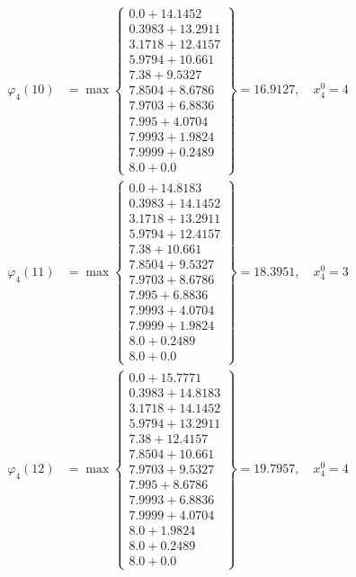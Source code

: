 \documentclass{article}
\begin{document}
\begin{align*}
  
  
  
\varphi_{4}(10) &= \max \left\{ \begin{array}{c}
0.0 + 14.1452 \\
 0.3983 + 13.2911 \\
 3.1718 + 12.4157 \\
 5.9794 + 10.661 \\
 7.38 + 9.5327 \\
 7.8504 + 8.6786 \\
 7.9703 + 6.8836 \\
 7.995 + 4.0704 \\
 7.9993 + 1.9824 \\
 7.9999 + 0.2489 \\
 8.0 + 0.0
\end{array} \right\}=16.9127,\quad x_{4}^0=4\\
  
  
  
  
\varphi_{4}(11) &= \max \left\{ \begin{array}{c}
0.0 + 14.8183 \\
 0.3983 + 14.1452 \\
 3.1718 + 13.2911 \\
 5.9794 + 12.4157 \\
 7.38 + 10.661 \\
 7.8504 + 9.5327 \\
 7.9703 + 8.6786 \\
 7.995 + 6.8836 \\
 7.9993 + 4.0704 \\
 7.9999 + 1.9824 \\
 8.0 + 0.2489 \\
 8.0 + 0.0
\end{array} \right\}=18.3951,\quad x_{4}^0=3\\
  
  
  
  
\varphi_{4}(12) &= \max \left\{ \begin{array}{c}
0.0 + 15.7771 \\
 0.3983 + 14.8183 \\
 3.1718 + 14.1452 \\
 5.9794 + 13.2911 \\
 7.38 + 12.4157 \\
 7.8504 + 10.661 \\
 7.9703 + 9.5327 \\
 7.995 + 8.6786 \\
 7.9993 + 6.8836 \\
 7.9999 + 4.0704 \\
 8.0 + 1.9824 \\
 8.0 + 0.2489 \\
 8.0 + 0.0
\end{array} \right\}=19.7957,\quad x_{4}^0=4\\
  

\end{align*}
\end{document}
